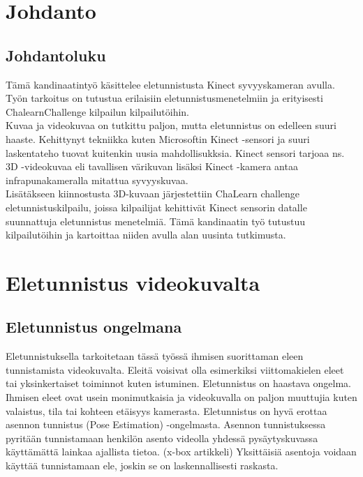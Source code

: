 
\section{Johdanto}



\subsection{Johdantoluku}

Tämä kandinaatintyö käsittelee eletunnistusta Kinect syvyyskameran avulla. 
Työn tarkoitus on tutustua erilaisiin eletunnistusmenetelmiin ja erityisesti ChalearnChallenge kilpailun kilpailutöihin. \\

Kuvaa ja videokuvaa on tutkittu paljon, mutta eletunnistus on edelleen suuri haaste. Kehittynyt tekniikka
kuten Microsoftin Kinect -sensori ja suuri laskentateho tuovat kuitenkin uusia mahdollisukksia. 
Kinect sensori tarjoaa ns. 3D -videokuvaa eli tavallisen värikuvan lisäksi Kinect -kamera antaa infrapunakameralla mitattua syvyyskuvaa.\\

Lisätäkseen kiinnostusta 3D-kuvaan järjestettiin ChaLearn challenge eletunnistuskilpailu, joissa kilpailijat kehittivät Kinect sensorin datalle suunnattuja 
eletunnistus menetelmiä. Tämä kandinaatin työ tutustuu kilpailutöihin ja kartoittaa niiden avulla alan uusinta tutkimusta. \\



\section{Eletunnistus videokuvalta}
\label{Eletunnistus videokuvalta}


\subsection{Eletunnistus ongelmana}
Eletunnistuksella tarkoitetaan tässä työssä ihmisen suorittaman eleen tunnistamista videokuvalta. Eleitä voisivat olla esimerkiksi
viittomakielen eleet tai yksinkertaiset toiminnot kuten istuminen. Eletunnistus on haastava ongelma. Ihmisen eleet ovat usein 
monimutkaisia ja videokuvalla on paljon muuttujia kuten valaistus, tila tai kohteen etäisyys kamerasta.\citep {1251144} Eletunnistus on hyvä erottaa
asennon tunnistus (Pose Estimation) -ongelmasta. Asennon tunnistuksessa pyritään tunnistamaan henkilön asento videolla yhdessä pysäytyskuvassa
käyttämättä lainkaa ajallista tietoa. (x-box artikkeli) Yksittäisiä asentoja voidaan käyttää tunnistamaan ele, joskin se on laskennallisesti raskasta.\\

